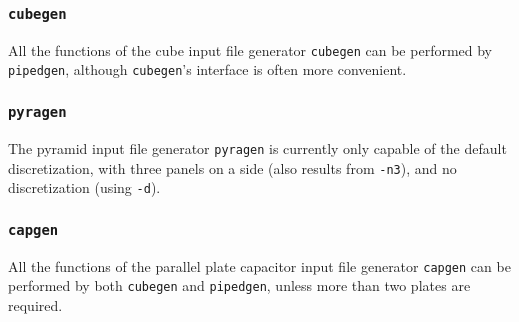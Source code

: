 \subsubsection*{\tt cubegen}

All the functions of the cube input file generator {\tt cubegen}
can be performed by {\tt pipedgen}, although {\tt cubegen}'s interface
is often more convenient.

\subsubsection*{\tt pyragen}

The pyramid input file generator {\tt pyragen} is currently
only capable of the default discretization, with three panels on a
side (also results from {\tt -n3}), and no discretization (using {\tt -d}).

\subsubsection*{\tt capgen}

All the functions of the 
parallel plate capacitor input file generator {\tt capgen}
can be performed by both {\tt cubegen} and {\tt pipedgen}, unless more
than two plates are required.

